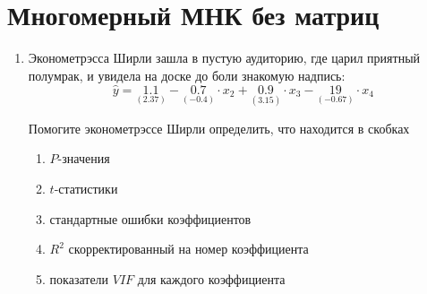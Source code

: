 \section{Многомерный МНК без матриц}

\begin{enumerate}
\item Эконометрэсса Ширли зашла в пустую аудиторию, где царил приятный полумрак, и увидела на доске до боли знакомую надпись:
\[
\hat{y}=\underset{(2.37)}{1.1}-\underset{(-0.4)}{0.7}\cdot x_2+\underset{(3.15)}{0.9}\cdot x_3-\underset{(-0.67)}{19}\cdot x_4
\]

Помогите эконометрэссе Ширли определить, что находится в скобках 
\begin{enumerate}
\item $P$-значения
\item $t$-статистики
\item стандартные ошибки коэффициентов
\item $R^2$ скорректированный на номер коэффициента
\item показатели $VIF$ для каждого коэффициента
\end{enumerate}


\end{enumerate}
